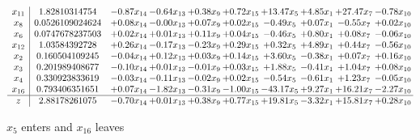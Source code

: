 \documentclass[9pt]{article}
\begin{document}
 \[\begin{array}{c| c c@{\hskip 2pt} c@{\hskip 2pt} c@{\hskip 2pt} c@{\hskip 2pt} c@{\hskip 2pt} c@{\hskip 2pt} c@{\hskip 2pt} c@{\hskip 2pt} }
 x_{11}   &  1.82810314754 & -0.87 x_{14} & -0.64 x_{13} & +  0.38 x_{9} & +  0.72 x_{15} & + 13.47 x_{5} & +  4.85 x_{1} & + 27.47 x_{7} & -0.78 x_{10}\\
 x_{8}   &  0.0526109024624 & +  0.08 x_{14} & -0.00 x_{13} & +  0.07 x_{9} & +  0.02 x_{15} & -0.49 x_{5} & +  0.07 x_{1} & -0.55 x_{7} & +  0.02 x_{10}\\
 x_{6}   &  0.0747678237503 & +  0.02 x_{14} & +  0.01 x_{13} & +  0.11 x_{9} & +  0.04 x_{15} & -0.46 x_{5} & +  0.80 x_{1} & +  0.08 x_{7} & -0.06 x_{10}\\
 x_{12}   &  1.03584392728 & +  0.26 x_{14} & -0.17 x_{13} & -0.23 x_{9} & +  0.29 x_{15} & +  0.32 x_{5} & +  4.89 x_{1} & +  0.44 x_{7} & -0.56 x_{10}\\
 x_{2}   &  0.160504109245 & -0.04 x_{14} & +  0.12 x_{13} & +  0.03 x_{9} & +  0.14 x_{15} & +  3.60 x_{5} & -0.38 x_{1} & +  0.07 x_{7} & +  0.16 x_{10}\\
 x_{3}   &  0.201989408677 & -0.10 x_{14} & +  0.01 x_{13} & -0.01 x_{9} & +  0.03 x_{15} & +  1.88 x_{5} & -0.41 x_{1} & +  1.04 x_{7} & +  0.08 x_{10}\\
 x_{4}   &  0.330923833619 & -0.03 x_{14} & -0.11 x_{13} & -0.02 x_{9} & +  0.02 x_{15} & -0.54 x_{5} & -0.61 x_{1} & +  1.23 x_{7} & -0.05 x_{10}\\
 x_{16}   &  0.793406351651 & +  0.07 x_{14} & -1.82 x_{13} & -0.31 x_{9} & -1.00 x_{15} & -43.17 x_{5} & +  9.27 x_{1} & + 16.21 x_{7} & -2.27 x_{10}\\
\hline
z    &  2.88178261075 & -0.70 x_{14} & +  0.01 x_{13} & +  0.38 x_{9} & +  0.77 x_{15} & + 19.81 x_{5} & -3.32 x_{1} & + 15.81 x_{7} & +  0.28 x_{10}\\
\end{array}\]


 $ x_{5} $ enters and $ x_{16} $ leaves 
\end{document}
